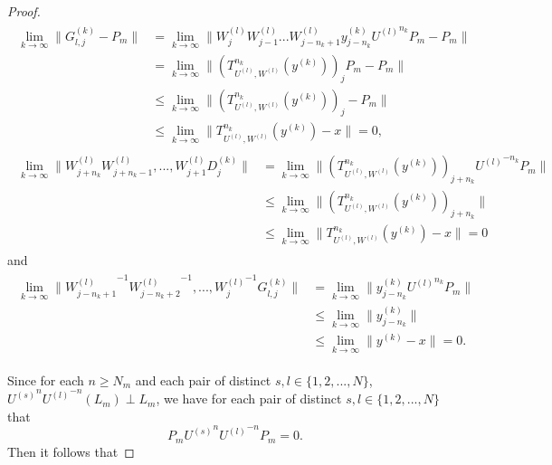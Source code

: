 \documentclass[10pt,a4paper]{amsart}
\begin{document}
\begin{proof}
\begin{eqnarray}\begin{split}\nonumber
\lim_{k\rightarrow\infty}\|G^{(k)}_{l,j}-P_{m}\|
&=\lim_{k\rightarrow\infty}\|W^{(l)}_{j}W^{(l)}_{j-1}...W^{(l)}_{j-n_{k}+1}y^{(k)}_{j-n_{k}}{U^{(l)}}^{n_{k}}P_{m}-P_{m}\|\\
&=\lim_{k\rightarrow\infty}\|\left(T^{n_{k}}_{U^{(l)},W^{(l)}}(y^{(k)})\right)_{j}P_{m}-P_{m}\|\\
&\leq \lim_{k\rightarrow\infty}\|\left(T^{n_{k}}_{U^{(l)},W^{(l)}}(y^{(k)})\right)_{j}-P_{m}\|\\
&\leq \lim_{k\rightarrow\infty}\|T^{n_{k}}_{U^{(l)},W^{(l)}}(y^{(k)})-x\|=0,
\end{split}\end{eqnarray}
\begin{eqnarray}\begin{split}\nonumber
\lim_{k\rightarrow\infty}\|W^{(l)}_{j+n_{k}}W^{(l)}_{j+n_{k}-1},...,W^{(l)}_{j+1}D^{(k)}_{j}\|&= \lim_{k\rightarrow\infty}\|\left(T^{n_{k}}_{U^{(l)},W^{(l)}}(y^{(k)})\right)_{j+n_{k}}{U^{(l)}}^{-n_{k}}P_{m}\| \\ &\leq\lim_{k\rightarrow\infty}\|\left(T^{n_{k}}_{U^{(l)},W^{(l)}}(y^{(k)})\right)_{j+n_{k}}\|\\
&\leq \lim_{k\rightarrow\infty}\|T^{n_{k}}_{U^{(l)},W^{(l)}}(y^{(k)})-x\|=0
\end{split}\end{eqnarray}
and
\begin{eqnarray}\begin{split}\nonumber
\lim_{k\rightarrow\infty}\|{W^{(l)}_{j-n_{k}+1}}^{-1}{W^{(l)}_{j-n_{k}+2}}^{-1},...,{W^{(l)}_{j}}^{-1}G^{(k)}_{l,j}\|
&=\lim_{k\rightarrow\infty}\|y^{(k)}_{j-n_{k}}{U^{(l)}}^{n_{k}}P_{m}\|\\
&\leq\lim_{k\rightarrow\infty}\|y^{(k)}_{j-n_{k}}\|\\
&\leq \lim_{k\rightarrow\infty}\|y^{(k)}-x\|=0.
\end{split}\end{eqnarray}

Since for each $n\geq N_{m}$ and each pair of distinct $s,l\in \{1,2,...,N\}$,  ${U^{(s)}}^{n}{U^{(l)}}^{-n}(L_{m})\perp L_{m}$, we have  for each pair of distinct $s,l\in \{1,2,...,N\}$ that
\[P_{m}{U^{(s)}}^{n}{U^{(l)}}^{-n}P_{m}=0.\]
Then it follows that



\end{proof}
\end{document}
